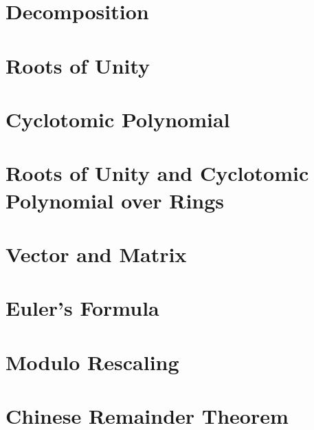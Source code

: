 \documentclass[11pt]{article}
\begin{document}
\clearpage

\section{Decomposition}
\label{sec:decomp}



\clearpage

\section{Roots of Unity}
\label{sec:roots}


\clearpage

\section{Cyclotomic Polynomial}
\label{sec:cyclotomic}


\clearpage

\section{Roots of Unity and Cyclotomic Polynomial over Rings}
\label{sec:cyclotomic-polynomial-integer-ring}


\clearpage

\section{Vector and Matrix}
\label{sec:matrix}


\clearpage

\section{Euler's Formula}
\label{sec:euler}


\clearpage

\section{Modulo Rescaling}
\label{sec:modulus-rescaling}


\clearpage

\section{Chinese Remainder Theorem}
\label{sec:chinese-remainder}

\end{document}
